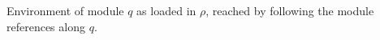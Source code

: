 Environment of module $q$ as loaded in $\rho$, reached by following the module references along $q$.
